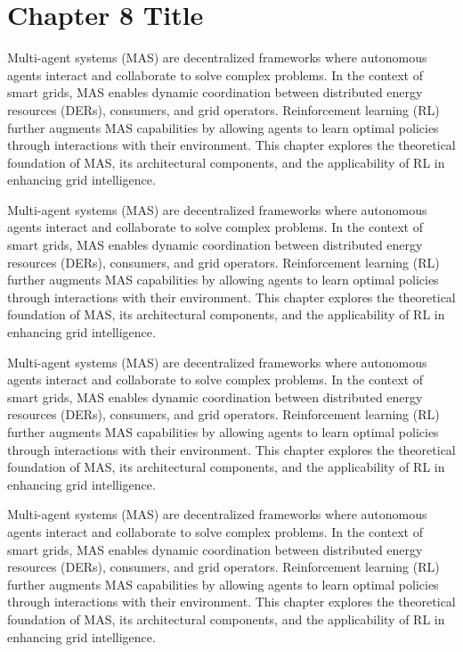 \chapter{Chapter 8 Title}


Multi-agent systems (MAS) are decentralized frameworks where autonomous agents interact and collaborate to solve complex problems. 
In the context of smart grids, MAS enables dynamic coordination between distributed energy resources (DERs), consumers, and grid operators. 
Reinforcement learning (RL) further augments MAS capabilities by allowing agents to learn optimal policies through interactions with their environment. 
This chapter explores the theoretical foundation of MAS, its architectural components, and the applicability of RL in enhancing grid intelligence.

Multi-agent systems (MAS) are decentralized frameworks where autonomous agents interact and collaborate to solve complex problems. 
In the context of smart grids, MAS enables dynamic coordination between distributed energy resources (DERs), consumers, and grid operators. 
Reinforcement learning (RL) further augments MAS capabilities by allowing agents to learn optimal policies through interactions with their environment. 
This chapter explores the theoretical foundation of MAS, its architectural components, and the applicability of RL in enhancing grid intelligence.

Multi-agent systems (MAS) are decentralized frameworks where autonomous agents interact and collaborate to solve complex problems. 
In the context of smart grids, MAS enables dynamic coordination between distributed energy resources (DERs), consumers, and grid operators. 
Reinforcement learning (RL) further augments MAS capabilities by allowing agents to learn optimal policies through interactions with their environment. 
This chapter explores the theoretical foundation of MAS, its architectural components, and the applicability of RL in enhancing grid intelligence.

Multi-agent systems (MAS) are decentralized frameworks where autonomous agents interact and collaborate to solve complex problems. 
In the context of smart grids, MAS enables dynamic coordination between distributed energy resources (DERs), consumers, and grid operators. 
Reinforcement learning (RL) further augments MAS capabilities by allowing agents to learn optimal policies through interactions with their environment. 
This chapter explores the theoretical foundation of MAS, its architectural components, and the applicability of RL in enhancing grid intelligence.

